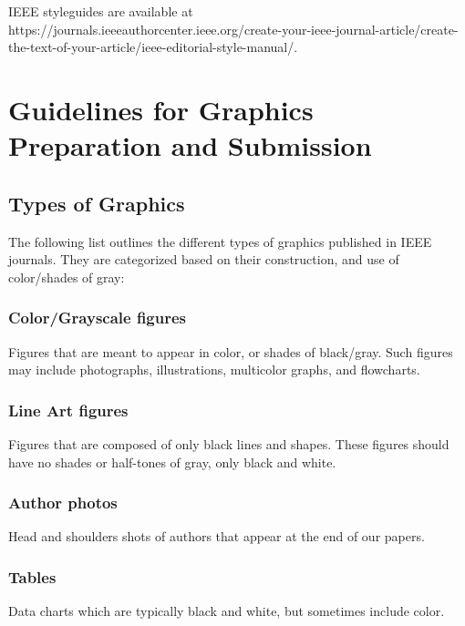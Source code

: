\documentclass[journal,onecolumn,web]{ieeecolor}
\begin{document}
IEEE styleguides are available at
https://journals.\discretionary{}{}{}ieeeauthorcenter.ieee.org/create-your-ieee-journal-article/\discretionary{}{}{}create-the-text-of-your-article/\discretionary{}{}{}ieee-editorial-style-manual/.

\section{Guidelines for Graphics Preparation and Submission}
\label{sec:guidelines}

\subsection{Types of Graphics}
The following list outlines the different types of graphics published in 
IEEE journals. They are categorized based on their construction, and use of 
color/shades of gray:

\subsubsection{Color/Grayscale figures}
{Figures that are meant to appear in color, or shades of black/gray. Such 
figures may include photographs, illustrations, multicolor graphs, and 
flowcharts.}

\subsubsection{Line Art figures}
{Figures that are composed of only black lines and shapes. These figures 
should have no shades or half-tones of gray, only black and white.}

\subsubsection{Author photos}
{Head and shoulders shots of authors that appear at the end of our papers. }

\subsubsection{Tables}
{Data charts which are typically black and white, but sometimes include 
color.}
\end{document}
